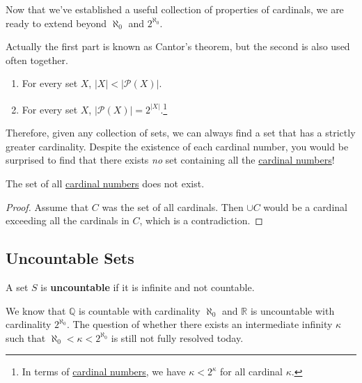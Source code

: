   Now that we've established a useful collection of properties of cardinals, we are ready to extend beyond $\aleph_0$ and $2^{\aleph_0}$. 

  \begin{theorem}
    \label{thm:cantors-theorem}
 
    Actually the first part is known as Cantor's theorem, but the second is also used often together. 
    \begin{enumerate}
      \item For every set $X$, $|X| < |\mathcal{P}(X)|$. 
      \item For every set $X$, $|\mathcal{P}(X)| = 2^{|X|}$.\footnote{In terms of \hyperref[def:cardinal-numbers]{cardinal numbers}, we have $\kappa < 2^\kappa$ for all cardinal $\kappa$.}
    \end{enumerate}
  \end{theorem} 

  Therefore, given any collection of sets, we can always find a set that has a strictly greater cardinality. Despite the existence of each cardinal number, you would be surprised to find that there exists \textit{no} set containing all the \hyperref[def:cardinal-numbers]{cardinal numbers}! 

  \begin{theorem}
    \label{thm:set-of-cardinal-numbers-does-not-exist}
    The set of all \hyperref[def:cardinal-numbers]{cardinal numbers} does not exist. 
  \end{theorem}
  \begin{proof}
    Assume that $C$ was the set of all cardinals. Then $\cup C$ would be a cardinal exceeding all the cardinals in $C$, which is a contradiction. 
  \end{proof}

\subsection{Uncountable Sets} 

  \begin{definition}
    \label{def:uncountable-set}
    A set $S$ is \textbf{uncountable} if it is infinite and not countable. 
  \end{definition}

  We know that $\mathbb{Q}$ is countable with cardinality $\aleph_0$ and $\mathbb{R}$ is uncountable with cardinality $2^{\aleph_0}$. The question of whether there exists an intermediate infinity $\kappa$ such that $\aleph_0 < \kappa < 2^{\aleph_0}$ is still not fully resolved today. 

